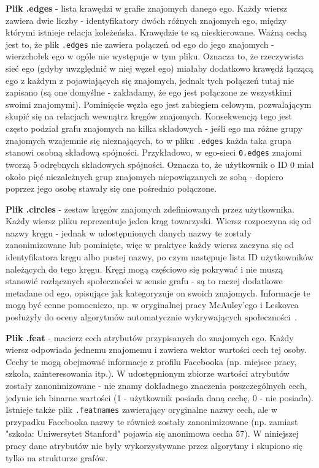 \textbf{Plik .edges} - lista krawędzi w grafie znajomych danego ego. Każdy wiersz zawiera dwie liczby - identyfikatory dwóch różnych znajomych ego, między którymi istnieje relacja koleżeńska. Krawędzie te są nieskierowane. Ważną cechą jest to, że plik \verb|.edges| nie zawiera połączeń od ego do jego znajomych - wierzchołek ego w ogóle nie występuje w tym pliku. Oznacza to, że rzeczywista sieć ego (gdyby uwzględnić w niej węzeł ego) miałaby dodatkowo krawędź łączącą ego z każdym z pojawiających się znajomych, jednak tych połączeń tutaj nie zapisano (są one domyślne - zakładamy, że ego jest połączone ze wszystkimi swoimi znajomymi). Pominięcie węzła ego jest zabiegiem celowym, pozwalającym skupić się na relacjach wewnątrz kręgów znajomych. Konsekwencją tego jest często podział grafu znajomych na kilka składowych - jeśli ego ma różne grupy znajomych wzajemnie się nieznających, to w pliku \verb|.edges| każda taka grupa stanowi osobną składową spójności. Przykładowo, w ego-sieci \verb|0.edges| znajomi tworzą 5 odrębnych składowych spójności. Oznacza to, że użytkownik o ID 0 miał około pięć niezależnych grup znajomych niepowiązanych ze sobą - dopiero poprzez jego osobę stawały się one pośrednio połączone.

\textbf{Plik .circles} - zestaw kręgów znajomych zdefiniowanych przez użytkownika. Każdy wiersz pliku reprezentuje jeden krąg towarzyski. Wiersz rozpoczyna się od nazwy kręgu - jednak w udostępnionych danych nazwy te zostały zanonimizowane lub pominięte, więc w praktyce każdy wiersz zaczyna się od identyfikatora kręgu albo pustej nazwy, po czym następuje lista ID użytkowników należących do tego kręgu. Kręgi mogą częściowo się pokrywać i nie muszą stanowić rozłącznych społeczności w sensie grafu - są to raczej dodatkowe metadane od ego, opisujące jak kategoryzuje on swoich znajomych. Informacje te mogą być cenne pomocniczo, np. w oryginalnej pracy McAuley'ego i Leskovca posłużyły do oceny algorytmów automatycznie wykrywających społeczności~\cite{McAuley2012}.

\textbf{Plik .feat} - macierz cech atrybutów przypisanych do znajomych ego. Każdy wiersz odpowiada jednemu znajomemu i zawiera wektor wartości cech tej osoby. Cechy te mogą obejmować informacje z profilu Facebooka (np. miejsce pracy, szkoła, zainteresowania itp.). W udostępnionym zbiorze wartości atrybutów zostały zanonimizowane - nie znamy dokładnego znaczenia poszczególnych cech, jedynie ich binarne wartości (1 - użytkownik posiada daną cechę, 0 - nie posiada). Istnieje także plik \verb|.featnames| zawierający oryginalne nazwy cech, ale w przypadku Facebooka nazwy te również zostały zanonimizowane (np. zamiast "szkoła: Uniwersytet Stanford" pojawia się anonimowa cecha 57). W niniejszej pracy dane atrybutów nie były wykorzystywane przez algorytmy i skupiono się tylko na strukturze grafów.

